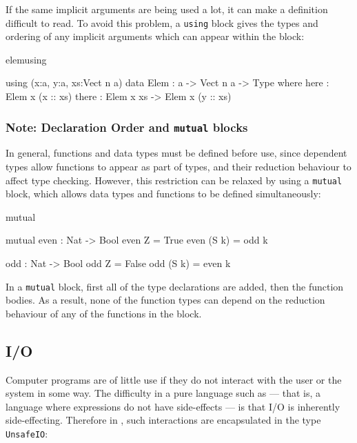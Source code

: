 \noindent
If the same implicit arguments are being used a lot, it can make a definition
difficult to read. To avoid this problem, a \texttt{using} block gives the types and
ordering of any implicit arguments which can appear within the block:

\begin{SaveVerbatim}{elemusing}

using (x:a, y:a, xs:Vect n a)
  data Elem : a -> Vect n a -> Type where
     here  : Elem x (x :: xs)
     there : Elem x xs -> Elem x (y :: xs)

\end{SaveVerbatim}

\subsubsection*{Note: Declaration Order and \texttt{mutual} blocks}

In general, functions and data types must be defined before use, since
dependent types allow functions to appear as part of types, and their
reduction behaviour to affect type checking. However, this
restriction can be relaxed by using a \texttt{mutual} block, which allows
data types and functions to be defined simultaneously:

\begin{SaveVerbatim}{mutual}

mutual
  even : Nat -> Bool
  even Z = True
  even (S k) = odd k

  odd : Nat -> Bool
  odd Z = False
  odd (S k) = even k

\end{SaveVerbatim}

\noindent
In a \texttt{mutual} block, first all of the type declarations are added,
then the function bodies. As a result, none of the function types can depend
on the reduction behaviour of any of the functions in the block.

\subsection{I/O}

Computer programs are of little use if they do not interact with the user or
the system in some way. The difficulty in a pure language such as \Idris{} ---
that is, a language where expressions do not have side-effects --- is that I/O
is inherently side-effecting. Therefore in \Idris{}, such interactions are
encapsulated in the type \texttt{UnsafeIO}:

